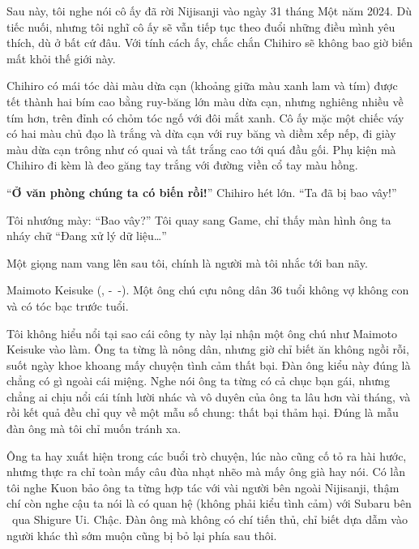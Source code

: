 \documentclass[../main.tex]{subfiles}
\begin{document}
Sau này, tôi nghe nói cô ấy đã rời Nijisanji vào ngày 31 tháng Một năm 2024. Dù tiếc nuối, nhưng tôi nghĩ cô ấy sẽ vẫn tiếp tục theo đuổi những điều mình yêu thích, dù ở bất cứ đâu. Với tính cách ấy, chắc chắn Chihiro sẽ không bao giờ biến mất khỏi thế giới này.


Chihiro có mái tóc dài màu dừa cạn (khoảng giữa màu xanh lam và tím) được tết thành hai bím cao bằng ruy-băng lớn màu dừa cạn, nhưng nghiêng nhiều về tím hơn, trên đỉnh có chỏm tóc ngố với đôi mắt xanh. Cô ấy mặc một chiếc váy có hai màu chủ đạo là trắng và dừa cạn với ruy băng và diềm xếp nếp, đi giày màu dừa cạn trông như có quai và tất trắng cao tới quá đầu gối. Phụ kiện mà Chihiro đi kèm là đeo găng tay trắng với đường viền cổ tay màu hồng.

\chrint

``\textbf{Ở văn phòng chúng ta có biến rồi!}'' Chihiro hét lớn. ``Ta đã bị bao vây!''

Tôi nhướng mày: ``Bao vây?'' Tôi quay sang Game, chỉ thấy màn hình ông ta nháy chữ ``Đang xử lý dữ liệu\dots''

Một giọng nam vang lên sau tôi, chính là người mà tôi nhắc tới ban nãy.

\chrint

Maimoto Keisuke (, -\ -). Một ông chú cựu nông dân 36 tuổi không vợ không con và có tóc bạc trước tuổi.

Tôi không hiểu nổi tại sao cái công ty này lại nhận một ông chú như Maimoto Keisuke vào làm. Ông ta từng là nông dân, nhưng giờ chỉ biết ăn không ngồi rỗi, suốt ngày khoe khoang mấy chuyện tình cảm thất bại. Đàn ông kiểu này đúng là chẳng có gì ngoài cái miệng. Nghe nói ông ta từng có cả chục bạn gái, nhưng chẳng ai chịu nổi cái tính lười nhác và vô duyên của ông ta lâu hơn vài tháng, và rồi kết quả đều chỉ quy về một mẫu số chung: thất bại thảm hại. Đúng là mẫu đàn ông mà tôi chỉ muốn tránh xa.

Ông ta hay xuất hiện trong các buổi trò chuyện, lúc nào cũng cố tỏ ra hài hước, nhưng thực ra chỉ toàn mấy câu đùa nhạt nhẽo mà mấy ông già hay nói. Có lần tôi nghe Kuon bảo ông ta từng hợp tác với vài người bên ngoài Nijisanji, thậm chí còn nghe cậu ta nói là có quan hệ (không phải kiểu tình cảm) với Subaru bên \hll\ qua Shigure Ui. Chậc. Đàn ông mà không có chí tiến thủ, chỉ biết dựa dẫm vào người khác thì sớm muộn cũng bị bỏ lại phía sau thôi.
\end{document}
